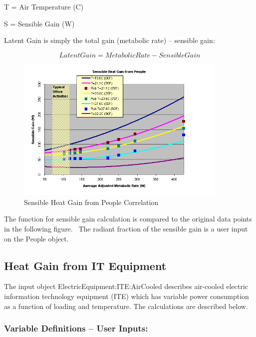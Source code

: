 T = Air Temperature (C)

S = Sensible Gain (W)

Latent Gain is simply the total gain (metabolic rate) -- sensible gain:

\begin{equation}
LatentGain = MetabolicRate - SensibleGain
\end{equation}

\begin{figure}[hbtp] %
\centering
\includegraphics[width=0.9\textwidth, height=0.9\textheight, keepaspectratio=true]{media/image5820.png}
\caption{  Sensible Heat Gain from People Correlation \protect \label{fig:sensible-heat-gain-from-people-correlation}}
\end{figure}

The function for sensible gain calculation is compared to the original data points in the following figure.~ The radiant fraction of the sensible gain is a user input on the People object.

\subsection{Heat Gain from IT Equipment}\label{heat-gain-from-it-equipment}

The input object ElectricEquipment:ITE:AirCooled describes air-cooled electric information technology equipment (ITE) which has variable power consumption as a function of loading and temperature. The calculations are described below.

\subsubsection{Variable Definitions -- User Inputs:}\label{variable-definitions-user-inputs}


